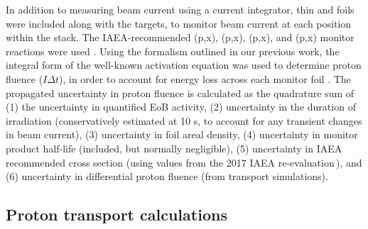 In addition to 
measuring beam current  using  a current integrator, thin  and  foils were included along with the  targets, 
to monitor beam current at each position within the stack.
The IAEA-recommended (p,x), (p,x),  (p,x), and (p,x) monitor reactions were used 
\cite{Hermanne2018}.
Using the formalism outlined in our previous work, the integral form of the well-known activation equation was used to  determine proton fluence ($I \Delta t $),
in order to account for energy loss across each monitor foil \cite{Voyles2018a}.
The propagated uncertainty in proton fluence is calculated as the quadrature sum of (1) the uncertainty in quantified EoB activity, (2) uncertainty in the duration of irradiation (conservatively estimated at 10 s, to account for any transient changes in beam current), (3) uncertainty in foil areal density, (4) uncertainty in monitor product half-life (included, but normally negligible), (5) uncertainty in IAEA recommended cross section (using values  from the 2017 IAEA re-evaluation\,\cite{Hermanne2018}), and (6) uncertainty in differential proton fluence (from transport simulations).






\subsection{\label{sec:proton_transport_fe}Proton transport calculations}

